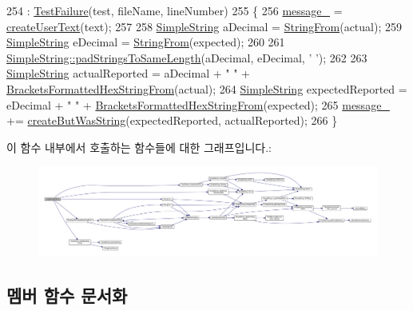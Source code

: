 \begin{DoxyCode}
254 : \hyperlink{class_test_failure_ac777aac1978181d7dfbb6be572da7341}{TestFailure}(test, fileName, lineNumber)
255 \{
256     \hyperlink{class_test_failure_af95aeab689fdb637c3e94b0c10db3e53}{message\_} = \hyperlink{class_test_failure_ae67765ada519d8a163922f50099a0016}{createUserText}(text);
257 
258     \hyperlink{class_simple_string}{SimpleString} aDecimal = \hyperlink{_simple_string_8h_a195ee4ca8d909f9ebf37e963d4564446}{StringFrom}(actual);
259     \hyperlink{class_simple_string}{SimpleString} eDecimal = \hyperlink{_simple_string_8h_a195ee4ca8d909f9ebf37e963d4564446}{StringFrom}(expected);
260 
261     \hyperlink{class_simple_string_ae697cd1c14c5ca884666fefa6a3b3af4}{SimpleString::padStringsToSameLength}(aDecimal, eDecimal, \textcolor{charliteral}{' '});
262 
263     \hyperlink{class_simple_string}{SimpleString} actualReported = aDecimal + \textcolor{stringliteral}{" "} + 
      \hyperlink{_simple_string_8h_a79aff9fc6d44ba7c6f3dc9dc764c476a}{BracketsFormattedHexStringFrom}(actual);
264     \hyperlink{class_simple_string}{SimpleString} expectedReported = eDecimal + \textcolor{stringliteral}{" "} + 
      \hyperlink{_simple_string_8h_a79aff9fc6d44ba7c6f3dc9dc764c476a}{BracketsFormattedHexStringFrom}(expected);
265     \hyperlink{class_test_failure_af95aeab689fdb637c3e94b0c10db3e53}{message\_} += \hyperlink{class_test_failure_a14e11a7282409ba8fb985ab58c983856}{createButWasString}(expectedReported, actualReported);
266 \}
\end{DoxyCode}


이 함수 내부에서 호출하는 함수들에 대한 그래프입니다.\+:
\nopagebreak
\begin{figure}[H]
\begin{center}
\leavevmode
\includegraphics[width=350pt]{class_longs_equal_failure_a75845b79cfde1a0f3076fad7f57a3945_cgraph}
\end{center}
\end{figure}




\subsection{멤버 함수 문서화}
